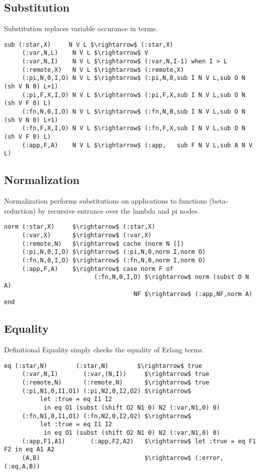 \documentclass{article}
\begin{document}
\subsection{Substitution}
Substitution replaces variable occurance in terms.

\begin{lstlisting}[mathescape=true]
 sub (:star,X)     N V L $\rightarrow$ (:star,X)
     (:var,N,L)    N V L $\rightarrow$ V
     (:var,N,I)    N V L $\rightarrow$ (:var,N,I-1) when I > L
     (:remote,X)   N V L $\rightarrow$ (:remote,X)
     (:pi,N,0,I,O) N V L $\rightarrow$ (:pi,N,0,sub I N V L,sub O N (sh V N 0) L+1)
     (:pi,F,X,I,O) N V L $\rightarrow$ (:pi,F,X,sub I N V L,sub O N (sh V F 0) L)
     (:fn,N,0,I,O) N V L $\rightarrow$ (:fn,N,0,sub I N V L,sub O N (sh V N 0) L+1)
     (:fn,F,X,I,O) N V L $\rightarrow$ (:fn,F,X,sub I N V L,sub O N (sh V F 0) L)
     (:app,F,A)    N V L $\rightarrow$ (:app,   sub F N V L,sub A N V L)
\end{lstlisting}

\subsection{Normalization}
Normalization performs substitutions on applications to functions (beta-reduction)
by recursive entrance over the lambda and pi nodes.

\begin{lstlisting}[mathescape=true]
norm (:star,X)     $\rightarrow$ (:star,X)
     (:var,X)      $\rightarrow$ (:var,X)
     (:remote,N)   $\rightarrow$ cache (norm N [])
     (:pi,N,0,I,O) $\rightarrow$ (:pi,N,0,norm I,norm O)
     (:fn,N,0,I,O) $\rightarrow$ (:fn,N,0,norm I,norm O)
     (:app,F,A)    $\rightarrow$ case norm F of
                         (:fn,N,0,I,O) $\rightarrow$ norm (subst O N A)
                                    NF $\rightarrow$ (:app,NF,norm A) end
\end{lstlisting}

\newpage
\subsection{Equality}
Definitional Equality simply checks the equality of Erlang terms.

\begin{lstlisting}[mathescape=true]
  eq (:star,N)        (:star,N)        $\rightarrow$ true
     (:var,N,I)       (:var,(N,I))     $\rightarrow$ true
     (:remote,N)      (:remote,N)      $\rightarrow$ true
     (:pi,N1,0,I1,O1) (:pi,N2,0,I2,O2) $\rightarrow$
          let :true = eq I1 I2
           in eq O1 (subst (shift O2 N1 0) N2 (:var,N1,0) 0)
     (:fn,N1,0,I1,O1) (:fn,N2,0,I2,O2) $\rightarrow$
          let :true = eq I1 I2
           in eq O1 (subst (shift O2 N1 0) N2 (:var,N1,0) 0)
     (:app,F1,A1)       (:app,F2,A2)   $\rightarrow$ let :true = eq F1 F2 in eq A1 A2
     (A,B)                             $\rightarrow$ (:error,(:eq,A,B))
\end{lstlisting}
\end{document}

